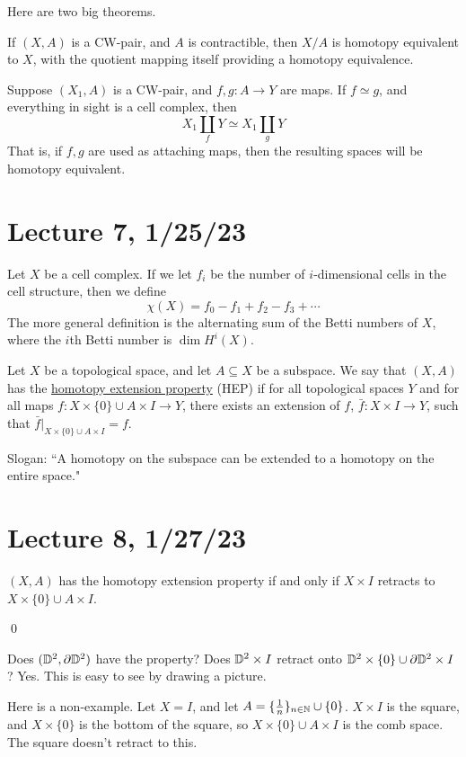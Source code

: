 \documentclass[x11names,reqno,14pt]{extarticle}
\begin{document}
Here are two big theorems. 

\thm If $(X, A)$ is a CW-pair, and $A$ is contractible, then $X/A$ is homotopy equivalent to $X$, with the quotient mapping itself providing a homotopy equivalence. 

\thm Suppose $(X_1, A)$ is a CW-pair, and $f, g:A\to Y$ are maps. If $f \simeq g$, and everything in sight is a cell complex, then
\[
X_1\coprod_f Y \simeq X_1 \coprod_g Y
\]
That is, if $f, g$ are used as attaching maps, then the resulting spaces will be homotopy equivalent. 

\section*{Lecture 7, 1/25/23}


Let $X$ be a cell complex. If we let $f_i$ be the number of $i$-dimensional cells in the cell structure, then we define
\[
\chi(X) = f_0 - f_1 + f_2 - f_3 + \cdots
\]
The more general definition is the alternating sum of the Betti numbers of $X$, where the $i$th Betti number is $\dim H^i(X)$. 


Let $X$ be a topological space, and let $A\subseteq X$ be a subspace. We say that $(X, A)$ has the \underline{homotopy extension property} (HEP) if for all topological spaces $Y$ and for all maps $f:X\times\{0\} \cup A \times I \to Y$, there exists an extension of $f$, $\bar{f}:X\times I \to Y$, such that $\bar{f}|_{X\times\{0\}\cup A\times I} = f$. 

Slogan: ``A homotopy on the subspace can be extended to a homotopy on the entire space." 

\section*{Lecture 8, 1/27/23}

\prop

$(X, A)$ has the homotopy extension property if and only if $X \times I$ retracts to $X\times\{0\} \cup A \times I$.

\proof

\qed

\exm 

Does $(\mathbb{D}^2, \partial\mathbb{D}^2)$ have the property? Does $\mathbb{D}^2\times I$ retract onto $\mathbb{D}^2\times\{0\}\cup \partial\mathbb{D}^2 \times I$? Yes. This is easy to see by drawing a picture. 

Here is a non-example. Let $X = I$, and let $A = \{\frac{1}{n}\}_{n\in\mathbb{N}}\cup\{0\}$. $X \times I$ is the square, and $X \times\{0\}$ is the bottom of the square, so $X\times \{0\} \cup A\times I$ is the comb space. The square doesn't retract to this. 
\end{document}
